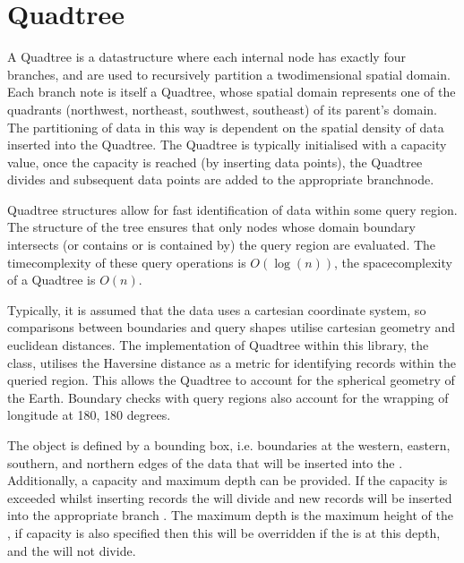 \documentclass[letterpaper,10pt,english]{sphinxmanual}
\begin{document}
\chapter{Quadtree}
\label{\detokenize{quadtree:quadtree}}\label{\detokenize{quadtree::doc}}
\sphinxAtStartPar
A Quadtree is a data\sphinxhyphen{}structure where each internal node has exactly four branches, and are used to recursively partition
a two\sphinxhyphen{}dimensional spatial domain. Each branch note is itself a Quadtree, whose spatial domain represents one of the
quadrants (north\sphinxhyphen{}west, north\sphinxhyphen{}east, south\sphinxhyphen{}west, south\sphinxhyphen{}east) of its parent’s domain. The partitioning of data in this way
is dependent on the spatial density of data inserted into the Quadtree. The Quadtree is typically initialised with a
capacity value, once the capacity is reached (by inserting data points), the Quadtree divides and subsequent data points
are added to the appropriate branch\sphinxhyphen{}node.

\sphinxAtStartPar
Quadtree structures allow for fast identification of data within some query region. The structure of the tree ensures
that only nodes whose domain boundary intersects (or contains or is contained by) the query region are evaluated. The
time\sphinxhyphen{}complexity of these query operations is \(O(\log(n))\), the space\sphinxhyphen{}complexity of a Quadtree is \(O(n)\).

\sphinxAtStartPar
Typically, it is assumed that the data uses a cartesian coordinate system, so comparisons between boundaries and query
shapes utilise cartesian geometry and euclidean distances. The implementation of Quadtree within this library, the
 class, utilises the Haversine distance as a metric for identifying records within the queried region.
This allows the Quadtree to account for the spherical geometry of the Earth. Boundary checks with query regions also
account for the wrapping of longitude at \sphinxhyphen{}180, 180 degrees.

\sphinxAtStartPar
The  object is defined by a bounding box, i.e. boundaries at the western, eastern, southern, and northern edges of
the data that will be inserted into the . Additionally, a capacity and maximum depth can be provided. If the
capacity is exceeded whilst inserting records the  will divide and new records will be inserted into the appropriate
branch . The maximum depth is the maximum height of the , if capacity is also specified then this will be
overridden if the  is at this depth, and the  will not divide.
\end{document}
